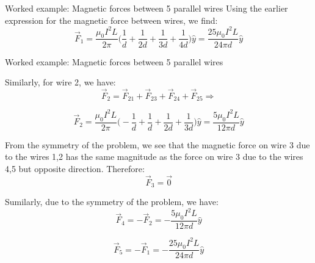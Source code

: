 {\begin{frame}{Worked example: Magnetic forces between 5 parallel wires}
  \vspace{0.2cm}
  Using the earlier expression for the magnetic force between wires, we find:
  \begin{equation*}
    \vec{F}_{1} =
      \frac{\mu_0 I^2 L}{2 \pi}
      \Big( \frac{1}{d} + \frac{1}{2d} + \frac{1}{3d} + \frac{1}{4d} \Big) \hat{y} =
      \frac{25 \mu_0 I^2 L}{24 \pi d} \hat{y}
  \end{equation*}

\end{frame}

%
%
%

\begin{frame}{Worked example: Magnetic forces between 5 parallel wires}

  Similarly, for wire 2, we have:
  \begin{equation*}
    \vec{F}_{2} = \vec{F}_{21} + \vec{F}_{23} + \vec{F}_{24} + \vec{F}_{25} \Rightarrow
  \end{equation*}

  \begin{equation*}
    \vec{F}_{2} =
      \frac{\mu_0 I^2 L}{2 \pi}
      \Big( - \frac{1}{d} + \frac{1}{d} + \frac{1}{2d} + \frac{1}{3d} \Big) \hat{y} =
      \frac{5 \mu_0 I^2 L}{12 \pi d} \hat{y}
  \end{equation*}

  \vspace{0.2cm}

  From the symmetry of the problem, we see that
  the magnetic force on wire 3 due to the wires 1,2
  has the same magnitude as the  force on wire 3 due to the wires 4,5
  but opposite direction. Therefore:
  \begin{equation*}
    \vec{F}_{3} = \vec{0}
  \end{equation*}

  Sumilarly, due to the symmetry of the problem, we have:
  \begin{equation*}
    \vec{F}_{4} = - \vec{F}_{2} = - \frac{5 \mu_0 I^2 L}{12 \pi d} \hat{y}
  \end{equation*}

  \begin{equation*}
    \vec{F}_{5} = - \vec{F}_{1} = - \frac{25 \mu_0 I^2 L}{24 \pi d} \hat{y}
  \end{equation*}

\end{frame}

} %


